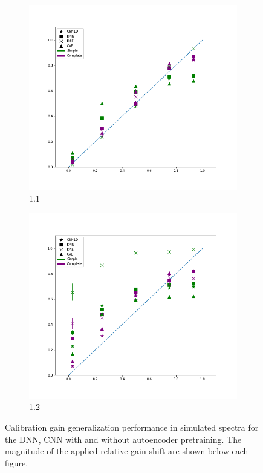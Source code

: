 \begin{figure}[H]
     \begin{subfigure}[b]{0.49\textwidth}
         \centering
         \includegraphics[width=\textwidth]{images/simuranium-cal11.png}
         \caption{1.1}
         \label{fig:simuranium-cal11}
     \end{subfigure}
     \hfill
     \begin{subfigure}[b]{0.49\textwidth}
         \centering
         \includegraphics[width=\textwidth]{images/simuranium-cal12.png}
         \caption{1.2}
         \label{fig:simuranium-cal12}
     \end{subfigure}
        \caption{Calibration gain generalization performance in simulated spectra for the DNN, CNN with and without autoencoder pretraining. The magnitude of the applied relative gain shift are shown below each figure.}
        \label{fig:simuranium-cal}
\end{figure}





